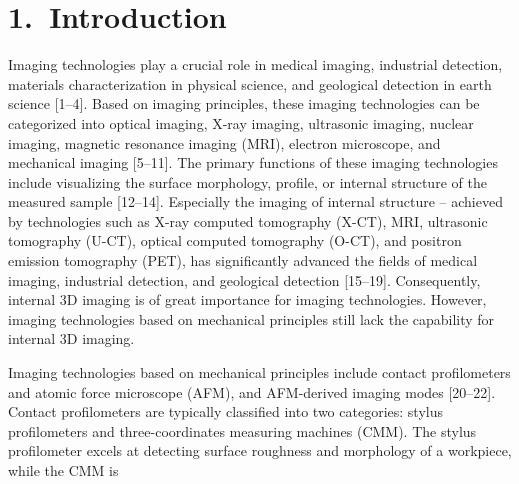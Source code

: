 \documentclass[11pt]{article}
\begin{document}
\section*{1.\ Introduction}

\noindent
Imaging technologies play a crucial role in medical imaging,
industrial detection, materials characterization in physical
science, and geological detection in earth science [1--4]. Based
on imaging principles, these imaging technologies can be
categorized into optical imaging, X-ray imaging, ultrasonic
imaging, nuclear imaging, magnetic resonance imaging (MRI),
electron microscope, and mechanical imaging [5--11]. The primary
functions of these imaging technologies include visualizing the
surface morphology, profile, or internal structure of the measured
sample [12--14]. Especially the imaging of internal structure --
achieved by technologies such as X-ray computed tomography (X-CT),
MRI, ultrasonic tomography (U-CT), optical computed tomography
(O-CT), and positron emission tomography (PET), has significantly
advanced the fields of medical imaging, industrial detection, and
geological detection [15--19]. Consequently, internal 3D imaging
is of great importance for imaging technologies. However, imaging
technologies based on mechanical principles still lack the
capability for internal 3D imaging.

Imaging technologies based on mechanical principles include
contact profilometers and atomic force microscope (AFM), and
AFM-derived imaging modes [20--22]. Contact profilometers are
typically classified into two categories: stylus profilometers
and three-coordinates measuring machines (CMM). The stylus
profilometer excels at detecting surface roughness and morphology
of a workpiece, while the CMM is
\end{document}
